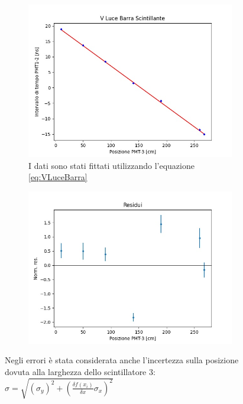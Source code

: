 \documentclass[a4paper]{article}
\begin{document}
\begin{figure}[H]
     \centering
     \begin{subfigure}[b]{0.47\textwidth}
         \centering
         \includegraphics[width=\textwidth]{./immagini/TimeOfFlight/VLightBarra.jpg}
         \caption{I dati sono stati fittati utilizzando l'equazione \ref{eq:VLuceBarra}}
         \label{fig:FitVLightBarra}
     \end{subfigure}
     \hfill
     \begin{subfigure}[b]{0.47\textwidth}
         \centering
         \includegraphics[width=\textwidth]{./immagini/TimeOfFlight/ResVLightBarra.jpg}
         \caption{}
         \label{fig:ResVLIghtBarra}
     \end{subfigure}
     \caption{Negli errori è stata considerata anche l'incertezza sulla posizione dovuta alla larghezza dello scintillatore 3: $\sigma = \sqrt{(\sigma _y)^2 + (\frac{\delta f(x_i)}{\delta x}\sigma _x)^2}$}        
     \label{fig:FitLinVLightBarra}
\end{figure}
\end{document}
